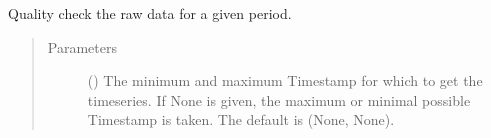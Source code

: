 \documentclass[letterpaper,10pt,english]{sphinxmanual}
\begin{document}
\begin{fulllineitems}
\begin{fulllineitems}
\label{\detokenize{weatherDB:weatherDB.station.StationTETBase.quality_check}}
\sphinxAtStartPar
Quality check the raw data for a given period.
\begin{quote}\begin{description}
\item[{Parameters}] \leavevmode
\sphinxAtStartPar
{} (\sphinxstyleliteralemphasis{\sphinxupquote{(}}\sphinxstyleliteralemphasis{\sphinxupquote{)}}\sphinxstyleliteralemphasis{\sphinxupquote{, }}) \textendash{} The minimum and maximum Timestamp for which to get the timeseries.
If None is given, the maximum or minimal possible Timestamp is taken.
The default is (None, None).

\end{description}\end{quote}

\end{fulllineitems}


\end{fulllineitems}

\end{document}
